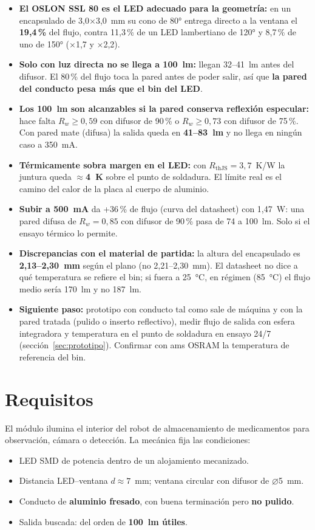 \documentclass[11pt,a4paper]{article}
\begin{document}
\begin{itemize}
  \item \textbf{El OSLON SSL 80 es el LED adecuado para la geometría:} en un encapsulado de 3,0$\times$3,0~mm su
        cono de 80° entrega directo a la ventana el \textbf{19,4\,\%} del flujo, contra 11,3\,\% de un LED
        lambertiano de 120° y 8,7\,\% de uno de 150° ($\times$1,7 y $\times$2,2).
  \item \textbf{Solo con luz directa no se llega a 100~lm:} llegan 32--41~lm antes del difusor. El 80\,\% del flujo
        toca la pared antes de poder salir, así que \textbf{la pared del conducto pesa más que el bin del LED}.
  \item \textbf{Los 100~lm son alcanzables si la pared conserva reflexión especular:} hace falta
        $R_w \geq 0{,}59$ con difusor de 90\,\% o $R_w \geq 0{,}73$ con difusor de 75\,\%. Con pared mate
        (difusa) la salida queda en \textbf{41--83~lm} y no llega en ningún caso a 350~mA.
  \item \textbf{Térmicamente sobra margen en el LED:} con $R_\mathrm{thJS}=3{,}7$~K/W la juntura queda
        \textbf{$\approx$4~K} sobre el punto de soldadura. El límite real es el camino del calor de la placa al
        cuerpo de aluminio.
  \item \textbf{Subir a 500~mA} da +36\,\% de flujo (curva del datasheet) con 1,47~W: una pared difusa de
        $R_w=0{,}85$ con difusor de 90\,\% pasa de 74 a 100~lm. Solo si el ensayo térmico lo permite.
  \item \textbf{Discrepancias con el material de partida:} la altura del encapsulado es \textbf{2,13--2,30~mm}
        según el plano (no 2,21--2,30~mm). El datasheet no dice a qué temperatura se refiere el bin; si fuera a
        25~°C, en régimen (85~°C) el flujo medio sería 170~lm y no 187~lm.
  \item \textbf{Siguiente paso:} prototipo con conducto tal como sale de máquina y con la pared tratada (pulido o
        inserto reflectivo), medir flujo de salida con esfera integradora y temperatura en el punto de
        soldadura en ensayo 24/7 (sección~\ref{sec:prototipo}). Confirmar con ams OSRAM la temperatura de
        referencia del bin.
\end{itemize}

\section{Requisitos}
El módulo ilumina el interior del robot de almacenamiento de medicamentos para observación, cámara o detección.
La mecánica fija las condiciones:
\begin{itemize}
  \item LED SMD de potencia dentro de un alojamiento mecanizado.
  \item Distancia LED--ventana $d \approx 7$~mm; ventana circular con difusor de $\varnothing$5~mm.
  \item Conducto de \textbf{aluminio fresado}, con buena terminación pero \textbf{no pulido}.
  \item Salida buscada: del orden de \textbf{100~lm útiles}.
\end{itemize}
\end{document}

